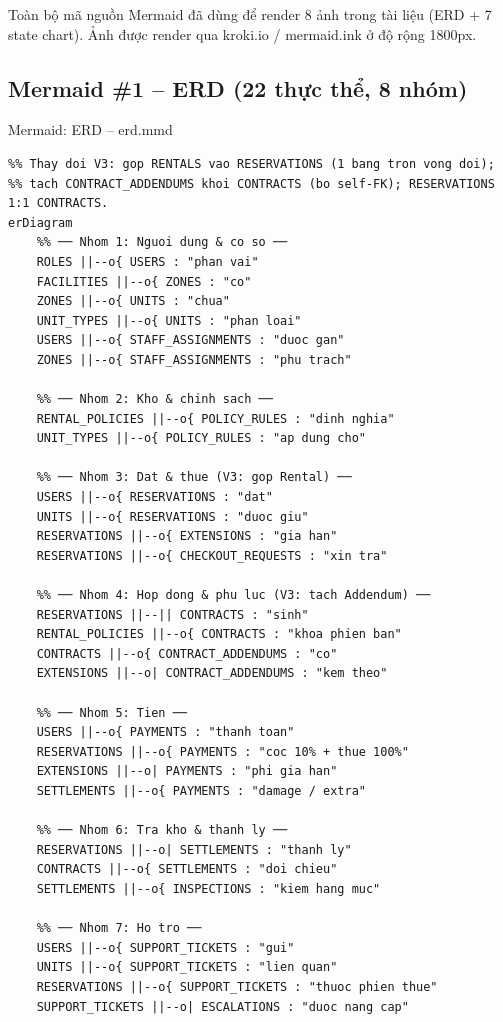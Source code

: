 \documentclass[12pt,a4paper]{article}
\renewcommand{\_}{\textunderscore\allowbreak}
\begin{document}
Toàn bộ mã nguồn Mermaid đã dùng để render 8 ảnh trong tài liệu (ERD + 7 state chart). Ảnh được render qua kroki.io / mermaid.ink ở độ rộng 1800px.

\subsection{Mermaid \#1 -- ERD (22 thực thể, 8 nhóm)}

\begin{mermaidbox}{Mermaid: ERD -- erd.mmd}
\begin{Verbatim}[fontsize=\small]
%% StorageHub - ERD (crow's foot) - 22 thuc the, 8 nhom - V3 2026-09-18
%% Thay doi V3: gop RENTALS vao RESERVATIONS (1 bang tron vong doi);
%% tach CONTRACT_ADDENDUMS khoi CONTRACTS (bo self-FK); RESERVATIONS 1:1 CONTRACTS.
erDiagram
    %% ── Nhom 1: Nguoi dung & co so ──
    ROLES ||--o{ USERS : "phan vai"
    FACILITIES ||--o{ ZONES : "co"
    ZONES ||--o{ UNITS : "chua"
    UNIT_TYPES ||--o{ UNITS : "phan loai"
    USERS ||--o{ STAFF_ASSIGNMENTS : "duoc gan"
    ZONES ||--o{ STAFF_ASSIGNMENTS : "phu trach"

    %% ── Nhom 2: Kho & chinh sach ──
    RENTAL_POLICIES ||--o{ POLICY_RULES : "dinh nghia"
    UNIT_TYPES ||--o{ POLICY_RULES : "ap dung cho"

    %% ── Nhom 3: Dat & thue (V3: gop Rental) ──
    USERS ||--o{ RESERVATIONS : "dat"
    UNITS ||--o{ RESERVATIONS : "duoc giu"
    RESERVATIONS ||--o{ EXTENSIONS : "gia han"
    RESERVATIONS ||--o{ CHECKOUT_REQUESTS : "xin tra"

    %% ── Nhom 4: Hop dong & phu luc (V3: tach Addendum) ──
    RESERVATIONS ||--|| CONTRACTS : "sinh"
    RENTAL_POLICIES ||--o{ CONTRACTS : "khoa phien ban"
    CONTRACTS ||--o{ CONTRACT_ADDENDUMS : "co"
    EXTENSIONS ||--o| CONTRACT_ADDENDUMS : "kem theo"

    %% ── Nhom 5: Tien ──
    USERS ||--o{ PAYMENTS : "thanh toan"
    RESERVATIONS ||--o{ PAYMENTS : "coc 10% + thue 100%"
    EXTENSIONS ||--o| PAYMENTS : "phi gia han"
    SETTLEMENTS ||--o{ PAYMENTS : "damage / extra"

    %% ── Nhom 6: Tra kho & thanh ly ──
    RESERVATIONS ||--o| SETTLEMENTS : "thanh ly"
    CONTRACTS ||--o{ SETTLEMENTS : "doi chieu"
    SETTLEMENTS ||--o{ INSPECTIONS : "kiem hang muc"

    %% ── Nhom 7: Ho tro ──
    USERS ||--o{ SUPPORT_TICKETS : "gui"
    UNITS ||--o{ SUPPORT_TICKETS : "lien quan"
    RESERVATIONS ||--o{ SUPPORT_TICKETS : "thuoc phien thue"
    SUPPORT_TICKETS ||--o| ESCALATIONS : "duoc nang cap"


\end{Verbatim}
\end{mermaidbox}
\end{document}
